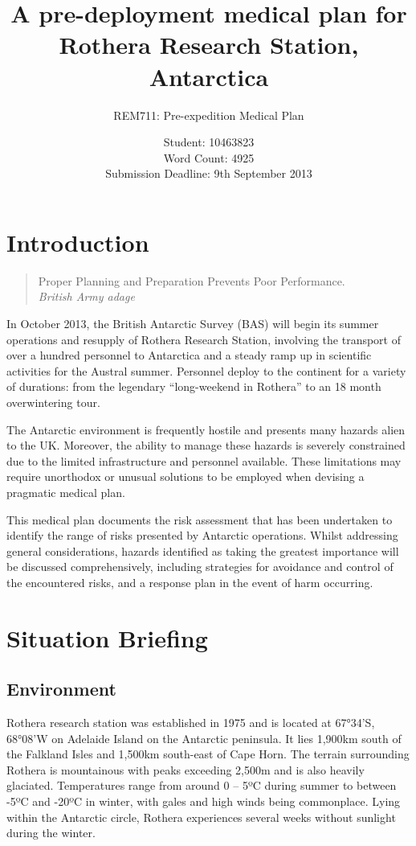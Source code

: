 \documentclass[12pt,a4paper]{article}
\title{A pre-deployment medical plan for Rothera Research Station, Antarctica}
\author{REM711: Pre-expedition Medical Plan}
\date{Student: 10463823 \\ Word Count: 4925 \\ Submission Deadline: 9th September 2013}
\begin{document}
\maketitle

\tableofcontents

\pagebreak

\section{Introduction}

\begin{quote}
Proper Planning and Preparation Prevents Poor Performance. \\
\em British Army adage
\end{quote}

In October 2013, the British Antarctic Survey (BAS) will begin its summer operations and resupply of Rothera Research Station, involving the transport of over a hundred personnel to Antarctica and a steady ramp up in scientific activities for the Austral summer. Personnel deploy to the continent for a variety of durations: from the legendary ``long-weekend in Rothera'' to an 18 month overwintering tour.

The Antarctic environment is frequently hostile and presents many hazards alien to the UK. Moreover, the ability to manage these hazards is severely constrained due to the limited infrastructure and personnel available. These limitations may require unorthodox or unusual solutions to be employed when devising a pragmatic medical plan.

This medical plan documents the risk assessment that has been undertaken to identify the range of risks presented by Antarctic operations. Whilst addressing general considerations, hazards identified as taking the greatest importance will be discussed comprehensively, including strategies for avoidance and control of the encountered risks, and a response plan in the event of harm occurring.

\section{Situation Briefing}

\subsection{Environment}

Rothera research station was established in 1975 and is located at 67°34'S, 68°08'W on Adelaide Island on the Antarctic peninsula. It lies 1,900km south of the Falkland Isles and 1,500km south-east of Cape Horn. The terrain surrounding Rothera is mountainous with peaks exceeding 2,500m and is also heavily glaciated. Temperatures range from around 0 -- 5ºC during summer to between -5ºC and -20ºC in winter, with gales and high winds being commonplace. Lying within the Antarctic circle, Rothera experiences several weeks without sunlight during the winter.
\end{document}
